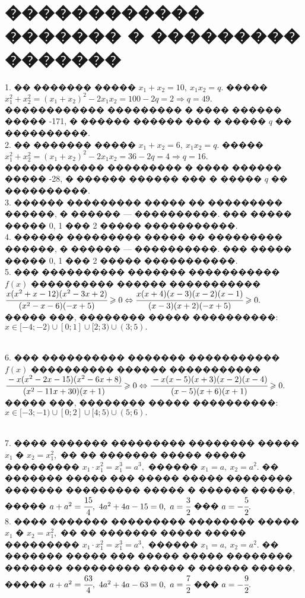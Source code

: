 \documentclass[12pt]{article}
\begin{document}
\section{������������ ������� � ��������� �������}
1. �� ������� ����� $x_1+x_2=10,\ x_1x_2=q.$ ����� $x_1^2+x_2^2=(x_1+x_2)^2-2x_1x_2=100-2q=2\Rightarrow q=49.$ ������������ ��������� � ���� ������ ����� -171, � ������ ������ ��� � ����� $q$ �� ����������.\\
2. �� ������� ����� $x_1+x_2=6,\ x_1x_2=q.$ ����� $x_1^2+x_2^2=(x_1+x_2)^2-2x_1x_2=36-2q=4\Rightarrow q=16.$ ������������ ��������� � ���� ������ ����� -28, � ������ ������ ��� � ����� $q$ �� ����������.\\
3. ������ ��������� ����� �� ��������� ������, � ������ --- ����������. ��� ����� ����� 0, 1 ��� 2 ����� �����������.\\
4. ������ ��������� ����� �� ��������� ������, � ������ --- ����������. ��� ����� ����� 0, 1 ��� 2 ����� �����������.\\
5. ��� ���������� ������� ����������� $f(x)$ ���������� ������ �����������\\ $\cfrac{x(x^2+x-12)(x^2-3x+2)}{(x^2-x-6)(-x+5)}\geqslant0
\Leftrightarrow \cfrac{x(x+4)(x-3)(x-2)(x-1)}{(x-3)(x+2)(-x+5)}\geqslant0.$ ����� ���, �������� ����� ����������:
$x\in[-4;-2)\cup[0;1]\cup[2;3)\cup(3;5).$
\begin{figure}[ht!]
\end{figure}\\
6. ��� ���������� ������� ����������� $f(x)$ ���������� ������ �����������\\ $\cfrac{-x(x^2-2x-15)(x^2-6x+8)}{(x^2-11x+30)(x+1)}\geqslant0
\Leftrightarrow \cfrac{-x(x-5)(x+3)(x-2)(x-4)}{(x-5)(x+6)(x+1)}\geqslant0.$ ����� ���, �������� ����� ����������:
$x\in[-3;-1)\cup[0;2]\cup[4;5)\cup(5;6).$
\begin{figure}[ht!]
\end{figure}\\
7. ���� ������� ��������� �������� ����� $x_1$ � $x_2=x_1^2,$ �� �� ������� ����� ����� ��������� $x_1\cdot x_1^2=x_1^3=a^3,$ ������ $x_1=a,\ x_2=a^2.$ �� ������� ����� ��� ����� ����� �������� ������� ��������� ����� � ������ �����, ����� $a+a^2=\cfrac{15}{4},\ 4a^2+4a-15=0,\ a=\cfrac{3}{2}$ ��� $a=-\cfrac{5}{2}.$\\
8. ���� ������� ��������� �������� ����� $x_1$ � $x_2=x_1^2,$ �� �� ������� ����� ����� ��������� $x_1\cdot x_1^2=x_1^3=a^3,$ ������ $x_1=a,\ x_2=a^2.$ �� ������� ����� ��� ����� ����� �������� ������� ��������� ����� � ������ �����, ����� $a+a^2=\cfrac{63}{4},\ 4a^2+4a-63=0,\ a=\cfrac{7}{2}$ ��� $a=-\cfrac{9}{2}.$\\
\end{document}
